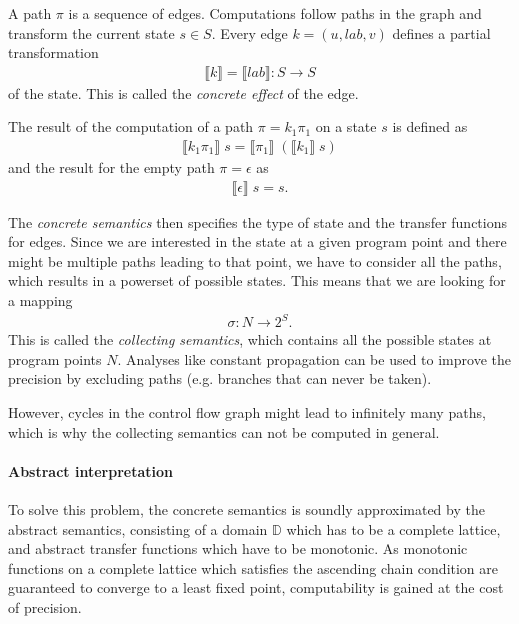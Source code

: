 A path $\pi$ is a sequence of edges.
Computations follow paths in the graph and transform the current state $s \in S$.
Every edge $k = (u, lab, v)$ defines a partial transformation
\begin{align}
\llbracket k \rrbracket = \llbracket lab \rrbracket : S \to S
\end{align}
of the state. This is called the \textit{concrete effect} of the edge.

The result of the computation of a path $\pi = k_1 \pi_1$ on a state $s$ is defined as
\begin{align}
\llbracket k_1 \pi_1 \rrbracket \; s = \llbracket \pi_1 \rrbracket \; (\llbracket k_1 \rrbracket \; s)
\end{align}
and the result for the empty path $\pi = \epsilon$ as
\begin{align}
\llbracket \epsilon \rrbracket \; s = s.
\end{align}

The \textit{concrete semantics} then specifies the type of state and the transfer functions for edges.
Since we are interested in the state at a given program point and there might be multiple paths leading to that point, we have to consider all the paths, which results in a powerset of possible states. This means that we are looking for a mapping
\begin{align}
\sigma : N \to 2^S.
\end{align}
This is called the \textit{collecting semantics}, which contains all the possible states at program points $N$.
Analyses like constant propagation can be used to improve the precision by excluding paths (e.g. branches that can never be taken).

However, cycles in the control flow graph might lead to infinitely many paths, which is why the collecting semantics can not be computed in general.

\paragraph*{Abstract interpretation}
To solve this problem, the concrete semantics is soundly approximated by the abstract semantics, consisting of a domain $\mathbb{D}$ which has to be a complete lattice, and abstract transfer functions which have to be monotonic. As monotonic functions on a complete lattice which satisfies the ascending chain condition are guaranteed to converge to a least fixed point, computability is gained at the cost of precision.

